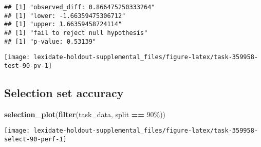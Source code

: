 \documentclass[
]{book}
\newenvironment{Shaded}{\begin{snugshade}}{\end{snugshade}}
\newcommand{\AttributeTok}[1]{\textcolor[rgb]{0.13,0.29,0.53}{#1}}
\newcommand{\DecValTok}[1]{\textcolor[rgb]{0.00,0.00,0.81}{#1}}
\newcommand{\FunctionTok}[1]{\textcolor[rgb]{0.13,0.29,0.53}{\textbf{#1}}}
\newcommand{\NormalTok}[1]{#1}
\newcommand{\OtherTok}[1]{\textcolor[rgb]{0.56,0.35,0.01}{#1}}
\newcommand{\SpecialCharTok}[1]{\textcolor[rgb]{0.81,0.36,0.00}{\textbf{#1}}}
\newcommand{\StringTok}[1]{\textcolor[rgb]{0.31,0.60,0.02}{#1}}
\begin{document}
\begin{Shaded}
\end{Shaded}

\begin{verbatim}
## [1] "observed_diff: 0.866475250333264"
## [1] "lower: -1.66359475306712"
## [1] "upper: 1.66359458724114"
## [1] "fail to reject null hypothesis"
## [1] "p-value: 0.53139"
\end{verbatim}

\texttt{[image: lexidate-holdout-supplemental\_files/figure-latex/task-359958-test-90-pv-1]}

\hypertarget{selection-set-accuracy-33}{%
\subsection{Selection set accuracy}\label{selection-set-accuracy-33}}

\begin{Shaded}
\begin{Highlighting}[]
\FunctionTok{selection\_plot}\NormalTok{(}\FunctionTok{filter}\NormalTok{(task\_data, split }\SpecialCharTok{==} \StringTok{\textquotesingle{}90\%\textquotesingle{}}\NormalTok{))}
\end{Highlighting}
\end{Shaded}

\texttt{[image: lexidate-holdout-supplemental\_files/figure-latex/task-359958-select-90-perf-1]}
\end{document}
